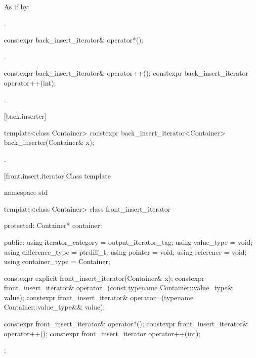 \begin{itemdescr}
\pnum
\effects
As if by: 

\pnum
\returns
{}.
\end{itemdescr}

%
\begin{itemdecl}
constexpr back_insert_iterator& operator*();
\end{itemdecl}

\begin{itemdescr}
\pnum
\returns
{}.
\end{itemdescr}

%
\begin{itemdecl}
constexpr back_insert_iterator& operator++();
constexpr back_insert_iterator  operator++(int);
\end{itemdecl}

\begin{itemdescr}
\pnum
\returns
{}.
\end{itemdescr}

[back.inserter]{ }

%
\begin{itemdecl}
template<class Container>
  constexpr back_insert_iterator<Container> back_inserter(Container& x);
\end{itemdecl}

\begin{itemdescr}
\pnum
\returns
{}.
\end{itemdescr}

[front.insert.iterator]{Class template }

%
\begin{codeblock}
namespace std {
  template<class Container>
  class front_insert_iterator {
  protected:
    Container* container;

  public:
    using iterator_category = output_iterator_tag;
    using value_type        = void;
    using difference_type   = ptrdiff_t;
    using pointer           = void;
    using reference         = void;
    using container_type    = Container;

    constexpr explicit front_insert_iterator(Container& x);
    constexpr front_insert_iterator& operator=(const typename Container::value_type& value);
    constexpr front_insert_iterator& operator=(typename Container::value_type&& value);

    constexpr front_insert_iterator& operator*();
    constexpr front_insert_iterator& operator++();
    constexpr front_insert_iterator  operator++(int);
  };
}
\end{codeblock}

